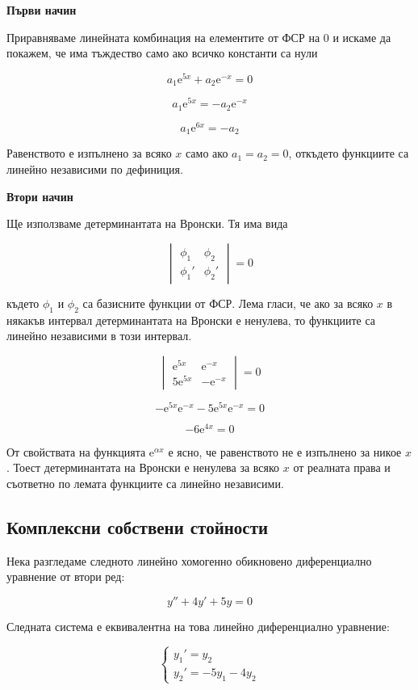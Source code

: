 \documentclass{scrartcl}
\begin{document}
\textbf{Първи начин}

Приравняваме линейната комбинация на елементите от ФСР на 0 и искаме да покажем, че има тъждество само ако всичко константи са нули

$$a_1\mathrm{e}^{5x} + a_2\mathrm{e}^{-x} = 0$$

$$a_1\mathrm{e}^{5x} = - a_2\mathrm{e}^{-x}$$

$$a_1\mathrm{e}^{6x} = - a_2$$

Равенството е изпълнено за всяко $x$ само ако $a_1 = a_2 = 0$, откъдето функциите са линейно независими по дефиниция.

\textbf{Втори начин}

Ще използваме детерминантата на Вронски. Тя има вида

$$
\begin{vmatrix}
    \phi_1 & \phi_2\\
    \phi_1' & \phi_2'
\end{vmatrix}
= 0
$$

където $\phi_1$ и $\phi_2$ са базисните функции от ФСР. Лема гласи, че ако за всяко $x$ в някакъв интервал детерминантата на Вронски е ненулева, то функциите са линейно независими в този интервал.

$$
\begin{vmatrix}
    \mathrm{e}^{5x} & \mathrm{e}^{-x}\\
    5\mathrm{e}^{5x} & -\mathrm{e}^{-x}
\end{vmatrix}
= 0
$$

$$-\mathrm{e}^{5x}\mathrm{e}^{-x} - 5\mathrm{e}^{5x}\mathrm{e}^{-x} = 0$$

$$-6\mathrm{e}^{4x} = 0$$

От свойствата на функцията $\mathrm{e}^{\alpha x}$ е ясно, че равенството не е изпълнено за никое $x$. Тоест детерминантата на Вронски е ненулева за всяко $x$ от реалната права и съответно по лемата функциите са линейно независими.

\subsection{Комплексни собствени стойности}

Нека разгледаме следното линейно хомогенно обикновено диференциално уравнение от втори ред:

$$y'' + 4y' + 5y = 0$$

Следната система е еквивалентна на това линейно диференциално уравнение:

$$
\begin{cases}
    y_1' = y_2\\
    y_2' = -5y_1 - 4y_2
\end{cases}
$$
\end{document}
